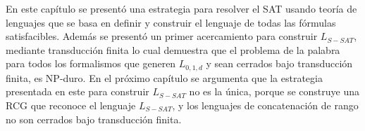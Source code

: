 En este capítulo se presentó una estrategia para resolver el SAT usando teoría de lenguajes que se basa en 
definir y construir el lenguaje de todas las fórmulas satisfacibles. Además se presentó un primer acercamiento 
para construir $L_{S-SAT}$, mediante transducción finita lo cual demuestra que el problema de la palabra para 
todos los formalismos que generen $L_{0,1,d}$ y sean cerrados bajo transducción finita, es NP-duro.  En el próximo 
capítulo se argumenta que la estrategia presentada en este para construir $L_{S-SAT}$ no es la única, porque se 
construye una RCG que reconoce el lenguaje $L_{S-SAT}$, y los lenguajes de concatenación de rango no son 
cerrados bajo transducción finita.
